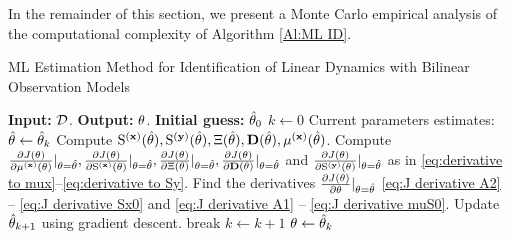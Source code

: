 In the remainder of this section, we present a Monte Carlo empirical analysis of the computational complexity of Algorithm \ref{Al:ML ID}.

\begin{algorithm}[t]
    \caption{ML Estimation Method for Identification of Linear Dynamics with Bilinear Observation Models}\label{Al:ML ID}
    \begin{algorithmic}
        \Statex \textbf{Input:} ${\mathcal{D}}$.
        \Statex \textbf{Output:} ${ \mathrm{\theta} }$.
        \State \textbf{Initial guess:} $\hat{{ \mathrm{\theta} }}_0$
        \State $k \gets 0$
            \State Current parameters estimates: $\hat{{ \mathrm{\theta} }} \gets \hat{{ \mathrm{\theta} }}_k$
            \State Compute ${ \mathrm{S} }^{(\mathbf{x})}{(\hat{{ \mathrm{\theta} }})}, { \mathrm{S} }^{(\mathbf{y})}{(\hat{{ \mathrm{\theta} }})}, \Xi{(\hat{{ \mathrm{\theta} }})}, \mathbf{D}{(\hat{{ \mathrm{\theta} }})}, \mu^{(\mathbf{x})}{(\hat{{ \mathrm{\theta} }})}$.
            \State Compute $\pdv{J({ \mathrm{\theta} })}{\mu^{(\mathbf{x})}({ \mathrm{\theta} })}|_{{ \mathrm{\theta} } = \hat{{ \mathrm{\theta} }}}, \pdv{J({ \mathrm{\theta} })}{{ \mathrm{S} }^{(\mathbf{x})}({ \mathrm{\theta} })}|_{{ \mathrm{\theta} } = \hat{{ \mathrm{\theta} }}}, \pdv{J({ \mathrm{\theta} })}{\Xi({ \mathrm{\theta} })}|_{{ \mathrm{\theta} } = \hat{{ \mathrm{\theta} }}}, \pdv{J({ \mathrm{\theta} })}{\mathbf{D}({ \mathrm{\theta} })}|_{{ \mathrm{\theta} } = \hat{{ \mathrm{\theta} }}}$ and $\pdv{J({ \mathrm{\theta} })}{{ \mathrm{S} }^{(\mathbf{y})}({ \mathrm{\theta} })}|_{{ \mathrm{\theta} } = \hat{{ \mathrm{\theta} }}}$ as in \eqref{eq:derivative to mux}--\eqref{eq:derivative to Sy}. 
            \State Find the derivatives $\pdv{J({ \mathrm{\theta} })}{{ \mathrm{\theta} }}|_{{ \mathrm{\theta} } = \hat{{ \mathrm{\theta} }}}$ 
            \eqref{eq:J derivative A2} -- \eqref{eq:J derivative Sx0} and \eqref{eq:J derivative A1} -- \eqref{eq:J derivative muS0}.
            \State Update $\hat{{ \mathrm{\theta} }}_{k+1}$ using gradient descent.
            \State break
            \Else
            \State $k \gets k+1$
            \EndIf
        \EndWhile
        \State ${ \mathrm{\theta} } \gets \hat{{ \mathrm{\theta} }}_k$
    \end{algorithmic}
    \label{alg_1}
\end{algorithm}




